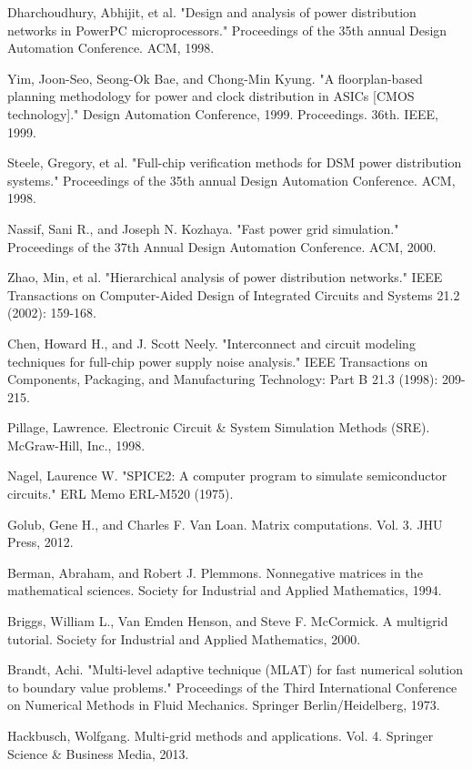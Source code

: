 \begin{enumerate}[{[}1{]}]
\item Dharchoudhury, Abhijit, et al. "Design and analysis of power distribution networks in PowerPC microprocessors." Proceedings of the 35th annual Design Automation Conference. ACM, 1998.
\item Yim, Joon-Seo, Seong-Ok Bae, and Chong-Min Kyung. "A floorplan-based planning methodology for power and clock distribution in ASICs [CMOS technology]." Design Automation Conference, 1999. Proceedings. 36th. IEEE, 1999.
\item Steele, Gregory, et al. "Full-chip verification methods for DSM power distribution systems." Proceedings of the 35th annual Design Automation Conference. ACM, 1998.
\item Nassif, Sani R., and Joseph N. Kozhaya. "Fast power grid simulation." Proceedings of the 37th Annual Design Automation Conference. ACM, 2000.
\item Zhao, Min, et al. "Hierarchical analysis of power distribution networks." IEEE Transactions on Computer-Aided Design of Integrated Circuits and Systems 21.2 (2002): 159-168.
\item Chen, Howard H., and J. Scott Neely. "Interconnect and circuit modeling techniques for full-chip power supply noise analysis." IEEE Transactions on Components, Packaging, and Manufacturing Technology: Part B 21.3 (1998): 209-215.
\item Pillage, Lawrence. Electronic Circuit \& System Simulation Methods (SRE). McGraw-Hill, Inc., 1998.
\item Nagel, Laurence W. "SPICE2: A computer program to simulate semiconductor circuits." ERL Memo ERL-M520 (1975).
\item Golub, Gene H., and Charles F. Van Loan. Matrix computations. Vol. 3. JHU Press, 2012.
\item Berman, Abraham, and Robert J. Plemmons. Nonnegative matrices in the mathematical sciences. Society for Industrial and Applied Mathematics, 1994.
\item Briggs, William L., Van Emden Henson, and Steve F. McCormick. A multigrid tutorial. Society for Industrial and Applied Mathematics, 2000.
\item Brandt, Achi. "Multi-level adaptive technique (MLAT) for fast numerical solution to boundary value problems." Proceedings of the Third International Conference on Numerical Methods in Fluid Mechanics. Springer Berlin/Heidelberg, 1973.
\item Hackbusch, Wolfgang. Multi-grid methods and applications. Vol. 4. Springer Science \& Business Media, 2013.

\end{enumerate}
